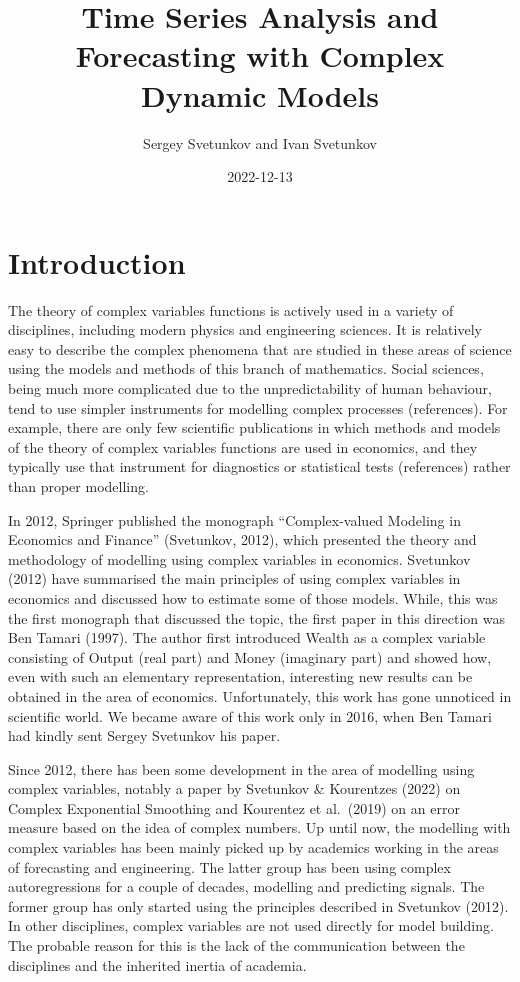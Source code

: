 \documentclass[
]{book}
\title{Time Series Analysis and Forecasting with Complex Dynamic Models}
\author{Sergey Svetunkov and Ivan Svetunkov}
\date{2022-12-13}
\begin{document}
\maketitle

{
\setcounter{tocdepth}{1}
\tableofcontents
}
\hypertarget{introduction}{%
\chapter*{Introduction}\label{introduction}}

The theory of complex variables functions is actively used in a variety of disciplines, including modern physics and engineering sciences. It is relatively easy to describe the complex phenomena that are studied in these areas of science using the models and methods of this branch of mathematics. Social sciences, being much more complicated due to the unpredictability of human behaviour, tend to use simpler instruments for modelling complex processes (references). For example, there are only few scientific publications in which methods and models of the theory of complex variables functions are used in economics, and they typically use that instrument for diagnostics or statistical tests (references) rather than proper modelling.

In 2012, Springer published the monograph ``Complex-valued Modeling in Economics and Finance'' (Svetunkov, 2012), which presented the theory and methodology of modelling using complex variables in economics. Svetunkov (2012) have summarised the main principles of using complex variables in economics and discussed how to estimate some of those models. While, this was the first monograph that discussed the topic, the first paper in this direction was Ben Tamari (1997). The author first introduced Wealth as a complex variable consisting of Output (real part) and Money (imaginary part) and showed how, even with such an elementary representation, interesting new results can be obtained in the area of economics. Unfortunately, this work has gone unnoticed in scientific world. We became aware of this work only in 2016, when Ben Tamari had kindly sent Sergey Svetunkov his paper.

Since 2012, there has been some development in the area of modelling using complex variables, notably a paper by Svetunkov \& Kourentzes (2022) on Complex Exponential Smoothing and Kourentez et al.~(2019) on an error measure based on the idea of complex numbers. Up until now, the modelling with complex variables has been mainly picked up by academics working in the areas of forecasting and engineering. The latter group has been using complex autoregressions for a couple of decades, modelling and predicting signals. The former group has only started using the principles described in Svetunkov (2012). In other disciplines, complex variables are not used directly for model building. The probable reason for this is the lack of the communication between the disciplines and the inherited inertia of academia.
\end{document}

